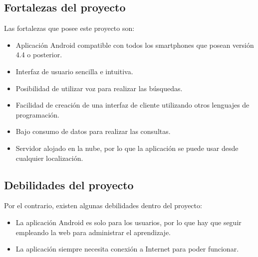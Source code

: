 \subsection{Fortalezas del proyecto}

Las fortalezas que posee este proyecto son:
\begin{itemize}
	\tightlist
	\item
	Aplicación Android compatible con todos los smartphones que posean versión 4.4 o posterior.
	\item 
	Interfaz de usuario sencilla e intuitiva.
	\item 
	Posibilidad de utilizar voz para realizar las búsquedas.
	\item 
	Facilidad de creación de una interfaz de cliente utilizando otros lenguajes de programación.
	\item 
	Bajo consumo de datos para realizar las consultas.
	\item 
	Servidor alojado en la nube, por lo que la aplicación se puede usar desde cualquier localización.
\end{itemize}

\subsection{Debilidades del proyecto}

Por el contrario, existen algunas debilidades dentro del proyecto:

\begin{itemize}
	\tightlist
	\item
	La aplicación Android es solo para los usuarios, por lo que hay que seguir empleando la web para administrar el aprendizaje.
	\item 
	La aplicación siempre necesita conexión a Internet para poder funcionar.
\end{itemize}
